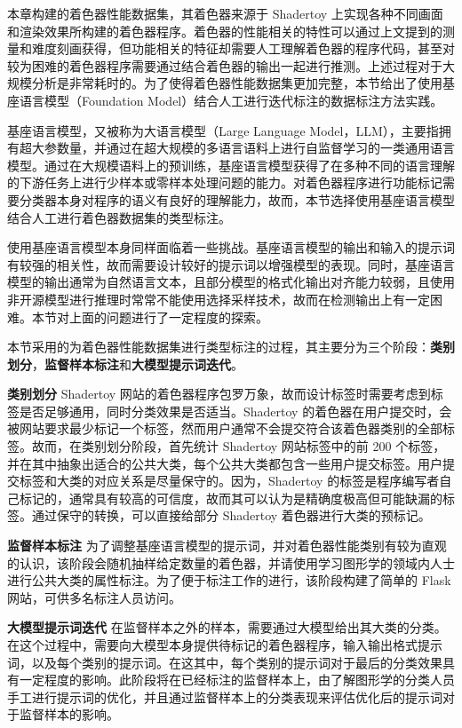 {\added 本章构建的着色器性能数据集，其着色器来源于 Shadertoy 上实现各种不同画面和渲染效果所构建的着色器程序。着色器的性能相关的特性可以通过上文提到的测量和难度刻画获得，但功能相关的特征却需要人工理解着色器的程序代码，甚至对较为困难的着色器程序需要通过结合着色器的输出一起进行推测。上述过程对于大规模分析是非常耗时的。为了使得着色器性能数据集更加完整，本节给出了使用基座语言模型（Foundation Model）结合人工进行迭代标注的数据标注方法实践。

基座语言模型，又被称为大语言模型（Large Language Model，LLM），主要指拥有超大参数量，并通过在超大规模的多语言语料上进行自监督学习的一类通用语言模型。通过在大规模语料上的预训练，基座语言模型获得了在多种不同的语言理解的下游任务上进行少样本或零样本处理问题的能力。对着色器程序进行功能标记需要分类器本身对程序的语义有良好的理解能力，故而，本节选择使用基座语言模型结合人工进行着色器数据集的类型标注。

使用基座语言模型本身同样面临着一些挑战。基座语言模型的输出和输入的提示词有较强的相关性，故而需要设计较好的提示词以增强模型的表现。同时，基座语言模型的输出通常为自然语言文本，且部分模型的格式化输出对齐能力较弱，且使用非开源模型进行推理时常常不能使用选择采样技术，故而在检测输出上有一定困难。本节对上面的问题进行了一定程度的探索。

本节采用的为着色器性能数据集进行类型标注的过程，其主要分为三个阶段：{\bf 类别划分}，{\bf 监督样本标注}和{\bf 大模型提示词迭代}。

{\bf 类别划分} Shadertoy 网站的着色器程序包罗万象，故而设计标签时需要考虑到标签是否足够通用，同时分类效果是否适当。Shadertoy 的着色器在用户提交时，会被网站要求最少标记一个标签，然而用户通常不会提交符合该着色器类别的全部标签。故而，在类别划分阶段，首先统计 Shadertoy 网站标签中的前 200 个标签，并在其中抽象出适合的公共大类，每个公共大类都包含一些用户提交标签。用户提交标签和大类的对应关系是尽量保守的。因为，Shadertoy 的标签是程序编写者自己标记的，通常具有较高的可信度，故而其可以认为是精确度极高但可能缺漏的标签。通过保守的转换，可以直接给部分 Shadertoy 着色器进行大类的预标记。

{\bf 监督样本标注} 为了调整基座语言模型的提示词，并对着色器性能类别有较为直观的认识，该阶段会随机抽样给定数量的着色器，并请使用学习图形学的领域内人士进行公共大类的属性标注。为了便于标注工作的进行，该阶段构建了简单的 Flask 网站，可供多名标注人员访问。

{\bf 大模型提示词迭代} 在监督样本之外的样本，需要通过大模型给出其大类的分类。在这个过程中，需要向大模型本身提供待标记的着色器程序，输入输出格式提示词，以及每个类别的提示词。在这其中，每个类别的提示词对于最后的分类效果具有一定程度的影响。此阶段将在已经标注的监督样本上，由了解图形学的分类人员手工进行提示词的优化，并且通过监督样本上的分类表现来评估优化后的提示词对于监督样本的影响。

}

